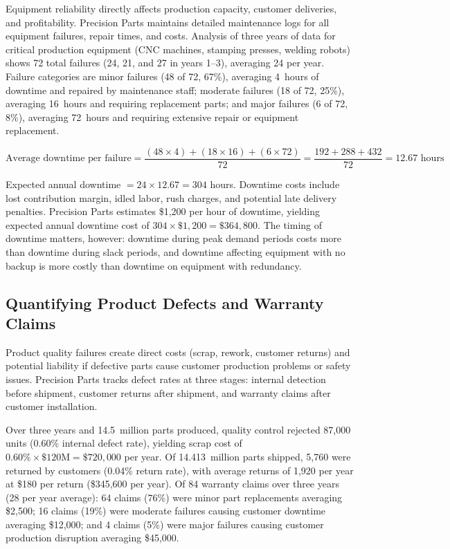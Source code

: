 \documentclass[11pt,openany]{book}
\begin{document}
Equipment reliability directly affects production capacity, customer deliveries,
and profitability. Precision Parts maintains detailed maintenance logs for all
equipment failures, repair times, and costs. Analysis of three years of data
for critical production equipment (CNC machines, stamping presses, welding
robots) shows 72 total failures (24, 21, and 27 in years 1--3), averaging 24
per year. Failure categories are minor failures (48 of 72, 67\%), averaging
4~hours of downtime and repaired by maintenance staff; moderate failures (18 of
72, 25\%), averaging 16~hours and requiring replacement parts; and major
failures (6 of 72, 8\%), averaging 72~hours and requiring extensive repair or
equipment replacement.

\[
  \text{Average downtime per failure}
  = \frac{(48 \times 4) + (18 \times 16) + (6 \times 72)}{72}
  = \frac{192 + 288 + 432}{72}
  = 12.67 \text{ hours}
\]

Expected annual downtime \(= 24 \times 12.67 = 304\) hours. Downtime costs
include lost contribution margin, idled labor, rush charges, and potential late
delivery penalties. Precision Parts estimates \$1,200 per hour of downtime,
yielding expected annual downtime cost of \(304 \times \$1{,}200 = \$364{,}800\).
The timing of downtime matters, however: downtime during peak demand periods
costs more than downtime during slack periods, and downtime affecting equipment
with no backup is more costly than downtime on equipment with redundancy.

\subsection{Quantifying Product Defects and Warranty Claims}
\label{subsec:precision-defects}

Product quality failures create direct costs (scrap, rework, customer returns)
and potential liability if defective parts cause customer production problems or
safety issues. Precision Parts tracks defect rates at three stages: internal
detection before shipment, customer returns after shipment, and warranty claims
after customer installation.

Over three years and 14.5~million parts produced, quality control rejected
87,000 units (0.60\% internal defect rate), yielding scrap cost of
\(0.60\% \times \$120\text{M} = \$720{,}000\) per year. Of 14.413~million
parts shipped, 5,760 were returned by customers (0.04\% return rate), with
average returns of 1,920 per year at \$180 per return (\$345,600 per year).
Of 84 warranty claims over three years (28 per year average): 64 claims (76\%)
were minor part replacements averaging \$2,500; 16 claims (19\%) were moderate
failures causing customer downtime averaging \$12,000; and 4 claims (5\%) were
major failures causing customer production disruption averaging \$45,000.
\end{document}
